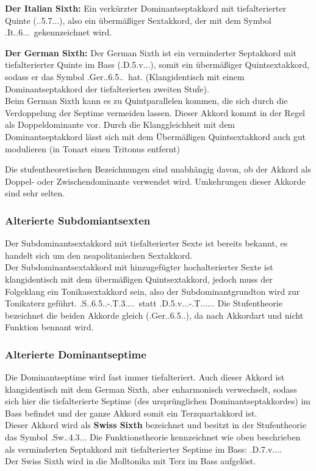 \documentclass[a4paper]{article}
\newcommand{\bel}[5]{\HH.#1.#5.#2.#3.#4.}
\newcommand{\T}{\HH.T.....}
\newcommand{\TS}{\HH.T.3....}
\newcommand{\Dhoch}[2]{\HH.D.#2.#1...}
\newcommand{\Dhochv}[2]{\HH.\Ohne{D}.#2.#1...} %
\begin{document}
\begin{description}
		\subitem \textbf{Der Italian Sixth:} Ein verkürzter Dominantseptakkord mit tiefalterierter Quinte (\Dhochv{7}{5\VM}), also ein übermäßiger Sextakkord, der mit dem Symbol \bel{It}{6}{}{}{}\ gekennzeichnet wird.
		
		\subitem \textbf{Der German Sixth:} Der German Sixth ist ein verminderter Septakkord mit tiefalterierter Quinte im Bass (\Dhoch{v}{5\VM}), somit ein übermäßiger Quintsextakkord, sodass er das Symbol \bel{Ger}{6}{5}{}{}\ hat. (Klangidentisch mit einem Dominantseptakkord der tiefalterierten zweiten Stufe).\\ 
		Beim German Sixth kann es zu Quintparallelen kommen, die sich durch die Verdoppelung der Septime vermeiden lassen. Dieser Akkord kommt in der Regel als Doppeldominante vor. Durch die Klanggleichheit mit dem Dominantseptakkord lässt sich mit dem Übermäßigen Quintsextakkord auch gut modulieren (in Tonart einen Tritonus entfernt)
	\end{description}
	Die stufentheoretischen Bezeichnungen sind unabhängig davon, ob der Akkord als Doppel- oder Zwischendominante verwendet wird. Umkehrungen dieser Akkorde sind sehr selten.
	
	\subsubsection{Alterierte Subdomiantsexten}
	Der Subdominantsextakkord mit tiefalterierter Sexte ist bereits bekannt, es handelt sich um den neapolitanischen Sextakkord.\\
	Der Subdominantsextakkord mit hinzugefügter hochalterierter Sexte ist klangidentisch mit dem übermäßigen Quintsextakkord, jedoch muss der Folgeklang ein Tonikasextakkord sein, also der Subdominantgrundton wird zur Tonikaterz geführt. \bel{S}{6\UB}{5}{}{}-\TS\ statt \Dhoch{v}{5\VM}-\T. Die Stufentheorie bezeichnet die beiden Akkorde gleich (\bel{Ger}{6}{5}{}{}), da nach Akkordart und nicht Funktion bennant wird.
	
	\subsubsection{Alterierte Dominantseptime}
	Die Dominantseptime wird fast immer tiefalteriert. Auch dieser Akkord ist klangidentisch mit dem German Sixth, aber enharmonisch verwechselt, sodass sich hier die tiefalterierte Septime (des ursprünglichen Dominantseptakkordes) im Bass befindet und der ganze Akkord somit ein Terzquartakkord ist. \\
	Dieser Akkord wird als \textbf{Swiss Sixth} bezeichnet und besitzt in der Stufentheorie das Symbol \bel{Sw}{4}{3}{}{}. Die Funktionstheorie kennzeichnet wie oben beschrieben als verminderten Septakkord mit tiefalterierter Septime im Bass: \Dhoch{v}{7\VM}. \\
	Der Swiss Sixth wird in die Molltonika mit Terz im Bass aufgelöst.
	
\end{document}
